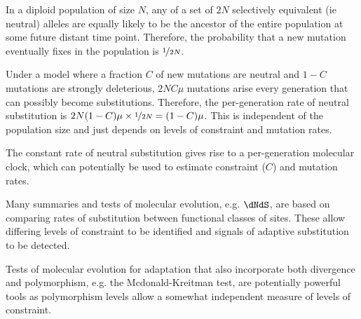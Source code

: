 





\newpage
\begin{ChapterSummary}
\item In a diploid population of size $N$, any of a set of $2N$ selectively equivalent (ie neutral) alleles are equally likely to be the ancestor of the entire population at some future distant time point. Therefore, the probability that a new mutation eventually fixes in the population is $\nicefrac{1}{2N}$.
  \item Under a model where a fraction $C$ of new mutations are
    neutral and $1-C$ mutations are strongly deleterious, $2NC\mu$
    mutations arise every generation that can possibly become substitutions. Therefore, the per-generation rate of neutral substitution is $2N(1-C)\mu
    \times \nicefrac{1}{2N} = (1-C)\mu$. This is independent of the population size and just depends on levels of constraint and mutation rates.
  \item The constant rate of neutral substitution gives rise to a per-generation molecular clock, which can potentially be used to estimate constraint ($C$) and mutation rates.
    \item Many summaries and tests of molecular evolution, e.g. $\dNdS$, are based on comparing rates of substitution between functional classes of sites. These allow differing levels of constraint to be identified and signals of adaptive substitution to be detected. 
      \item Tests of molecular evolution for adaptation that also incorporate
        both divergence and polymorphism, e.g. the  Mcdonald-Kreitman
        test, are potentially powerful tools as polymorphism levels allow a somewhat independent measure of levels of constraint.  

      \end{ChapterSummary}


